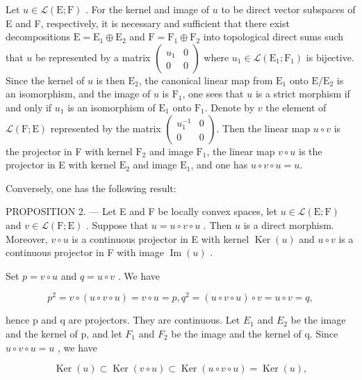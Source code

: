 Let \(u \in \mathcal{L}(\mathrm{E};\mathrm{F})\) . For the kernel and image of \(u\) to be direct vector subspaces of E and F, respectively, it is necessary and sufficient that there exist decompositions \(\mathrm{E} = \mathrm{E}_1 \oplus \mathrm{E}_2\) and \(\mathrm{F} = \mathrm{F}_1 \oplus \mathrm{F}_2\) into topological direct sums such that \(u\) be represented by a matrix \(\begin{pmatrix} u_1 & 0 \\ 0 & 0 \end{pmatrix}\) where \(u_1 \in \mathcal{L}(\mathrm{E}_1; \mathrm{F}_1)\) is bijective. Since the kernel of \(u\) is then \(\mathrm{E}_2\), the canonical linear map from \(\mathrm{E}_1\) onto \(\mathrm{E}/\mathrm{E}_2\) is an isomorphism, and the image of \(u\) is \(\mathrm{F}_1\), one sees that \(u\) is a strict morphism if and only if \(u_1\) is an isomorphism of \(\mathrm{E}_1\) onto \(\mathrm{F}_1\). Denote by \(v\) the element of \(\mathcal{L}(\mathrm{F};\mathrm{E})\) represented by the matrix \(\begin{pmatrix} u_1^{-1} & 0 \\ 0 & 0 \end{pmatrix}\). Then the linear map \(u \circ v\) is the projector in F with kernel \(\mathrm{F}_2\) and image \(\mathrm{F}_1\), the linear map \(v \circ u\) is the projector in E with kernel \(\mathrm{E}_2\) and image \(\mathrm{E}_1\), and one has \(u \circ v \circ u = u\).

Conversely, one has the following result:

PROPOSITION 2. --- Let E and F be locally convex spaces, let \(u \in \mathcal{L}(\mathrm{E};\mathrm{F})\) and \(v \in \mathcal{L}(\mathrm{F};\mathrm{E})\) . Suppose that \(u = u \circ v \circ u\) . Then \(u\) is a direct morphism. Moreover, \(v \circ u\) is a continuous projector in E with kernel \(\operatorname{Ker}(u)\) and \(u \circ v\) is a continuous projector in F with image \(\operatorname{Im}(u)\) .

Set \(p = v \circ u\) and \(q = u \circ v\) . We have

\[
p ^ {2} = v \circ (u \circ v \circ u) = v \circ u = p, q ^ {2} = (u \circ v \circ u) \circ v = u \circ v = q,
\]

hence p and q are projectors. They are continuous. Let \(E_{1}\) and \(E_{2}\) be the image and the kernel of p, and let \(F_{1}\) and \(F_{2}\) be the image and the kernel of q. Since \(u \circ v \circ u = u\) , we have

\[
\operatorname{Ker} (u) \subset \operatorname{Ker} (v \circ u) \subset \operatorname{Ker} (u \circ v \circ u) = \operatorname{Ker} (u),
\]

